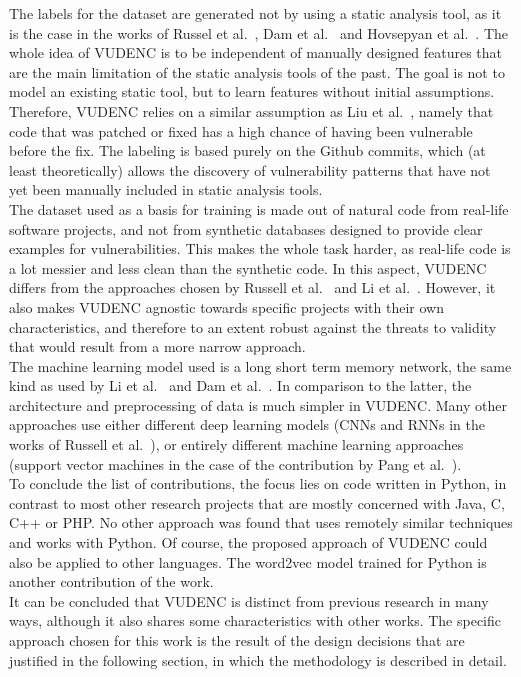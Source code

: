 \documentclass[
a4paper,
pagesize,
pdftex,
12pt,
ngerman,
fleqn,
final,
]{scrartcl}
\begin{document}
	The labels for the dataset are generated not by using a static analysis tool, as it is the case in the works of Russel et al.~\cite{Russell.2018}, Dam et al.~\cite{Dam.2017} and Hovsepyan et al.~\cite{Hovsepyan.2012}. The whole idea of VUDENC is to be independent of manually designed features that are the main limitation of the static analysis tools of the past. The goal is not to model an existing static tool, but to learn features without initial assumptions. Therefore, VUDENC relies on a similar assumption as Liu et al.~\cite{Liu.2018}, namely that code that was patched or fixed has a high chance of having been vulnerable before the fix. The labeling is based purely on the Github commits, which (at least theoretically) allows the discovery of vulnerability patterns that have not yet been manually included in static analysis tools.\\
	The dataset used as a basis for training is made out of natural code from real-life software projects, and not from synthetic databases designed to provide clear examples for vulnerabilities. This makes the whole task harder, as real-life code is a lot messier and less clean than the synthetic code. In this aspect, VUDENC differs from the approaches chosen by Russell et al.~\cite{Russell.2018} and Li et al.~\cite{Li.2018}. However, it also makes VUDENC agnostic towards specific projects with their own characteristics, and therefore to an extent robust against the threats to validity that would result from a more narrow approach.\\
	The machine learning model used is a long short term memory network, the same kind as used by Li et al.~\cite{Li.2018} and Dam et al.~\cite{Dam.2017}. In comparison to the latter, the architecture and preprocessing of data is much simpler in VUDENC. Many other approaches use either different deep learning models (CNNs and RNNs in the works of Russell et al.~\cite{Russell.2018}), or entirely different machine learning approaches (support vector machines in the case of the contribution by Pang et al.~\cite{Pang.2015}).\\
	To conclude the list of contributions, the focus lies on code written in Python, in contrast to most other research projects that are mostly concerned with Java, C, C++ or PHP. No other approach was found that uses remotely similar techniques and works with Python. Of course, the proposed approach of VUDENC could also be applied to other languages. The word2vec model trained for Python is another contribution of the work.\\
	It can be concluded that VUDENC is distinct from previous research in many ways, although it also shares some characteristics with other works. The specific approach chosen for this work is the result of the design decisions that are justified in the following section, in which the methodology is described in detail.
	
\end{document}
